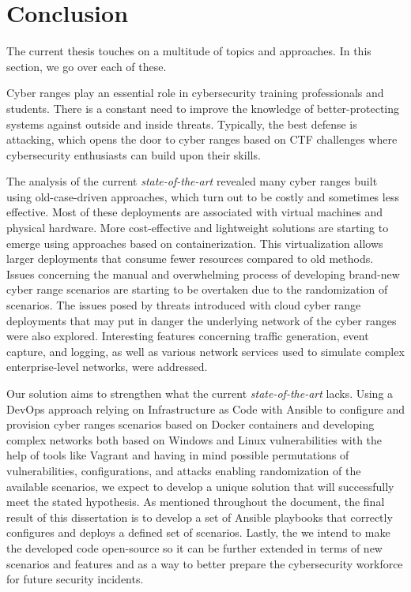\chapter{Conclusion}\label{chap:conclusion}

The current thesis touches on a multitude of topics and approaches. In this section, we go over each of these.

Cyber ranges play an essential role in cybersecurity training professionals and students. There is a constant need to improve the knowledge of better-protecting systems against outside and inside threats. Typically, the best defense is attacking, which opens the door to cyber ranges based on CTF challenges where cybersecurity enthusiasts can build upon their skills.

The analysis of the current \textit{state-of-the-art} revealed many cyber ranges built using old-case-driven approaches, which turn out to be costly and sometimes less effective. Most of these deployments are associated with virtual machines and physical hardware. More cost-effective and lightweight solutions are starting to emerge using approaches based on containerization. This virtualization allows larger deployments that consume fewer resources compared to old methods. Issues concerning the manual and overwhelming process of developing brand-new cyber range scenarios are starting to be overtaken due to the randomization of scenarios. The issues posed by threats introduced with cloud cyber range deployments that may put in danger the underlying network of the cyber ranges were also explored. Interesting features concerning traffic generation, event capture, and logging, as well as various network services used to simulate complex enterprise-level networks, were addressed.

Our solution aims to strengthen what the current \textit{state-of-the-art} lacks. Using a DevOps approach relying on Infrastructure as Code with Ansible to configure and provision cyber ranges scenarios based on Docker containers and developing complex networks both based on Windows and Linux vulnerabilities with the help of tools like Vagrant and having in mind possible permutations of vulnerabilities, configurations, and attacks enabling randomization of the available scenarios, we expect to develop a unique solution that will successfully meet the stated hypothesis. As mentioned throughout the document, the final result of this dissertation is to develop a set of Ansible playbooks that correctly configures and deploys a defined set of scenarios. Lastly, the we intend to make the developed code open-source so it can be further extended in terms of new scenarios and features and as a way to better prepare the cybersecurity workforce for future security incidents.

